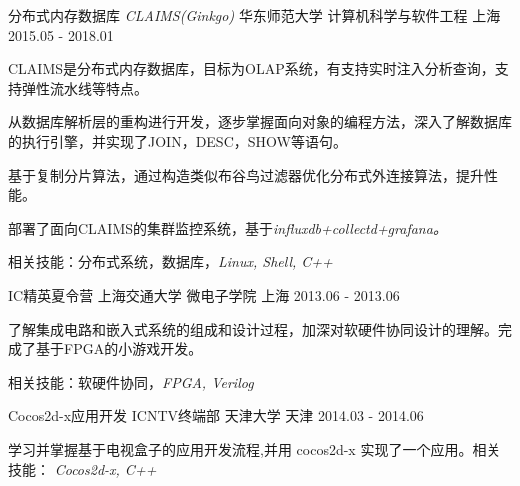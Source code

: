 \begin{cventries}
  \cventry
    {分布式内存数据库  \it{CLAIMS(Ginkgo)}  } 
    {华东师范大学 \quad 计算机科学与软件工程}
    {上海}
    {2015.05 - 2018.01}
    {
      \begin{cvitems}
	\item {CLAIMS是分布式内存数据库，目标为OLAP系统，有支持实时注入分析查询，支持弹性流水线等特点。}
	\item {从数据库解析层的重构进行开发，逐步掌握面向对象的编程方法，深入了解数据库的执行引擎，并实现了JOIN，DESC，SHOW等语句。}
	\item {基于复制分片算法，通过构造类似布谷鸟过滤器优化分布式外连接算法，提升性能。}
	\item {部署了面向CLAIMS的集群监控系统，基于\it{influxdb+collectd+grafana}。}
	\item {相关技能：分布式系统，数据库，\it{Linux, Shell, C++}}
	\item {\it\color{red}{https://github.com/FishYoung/CLAIMS/tree/for\_auto\_test}}
      \end{cvitems}
    }
  \cventry
    {IC精英夏令营}
    {上海交通大学 \quad 微电子学院}
    {上海}
    {2013.06 - 2013.06}
    {
      \begin{cvitems}
        \item {了解集成电路和嵌入式系统的组成和设计过程，加深对软硬件协同设计的理解。完成了基于FPGA的小游戏开发。}
        \item {相关技能：软硬件协同，\it{FPGA, Verilog}}
      \end{cvitems}
    }
  \cventry
    {Cocos2d-x应用开发}
    {ICNTV终端部 \quad 天津大学}
    {天津}
    {2014.03 - 2014.06}
    {
      \begin{cvitems}
	\item {学习并掌握基于电视盒子的应用开发流程,并用 cocos2d-x 实现了一个应用。相关技能： \it{Cocos2d-x, C++}}
      \end{cvitems}
    }
\end{cventries}
